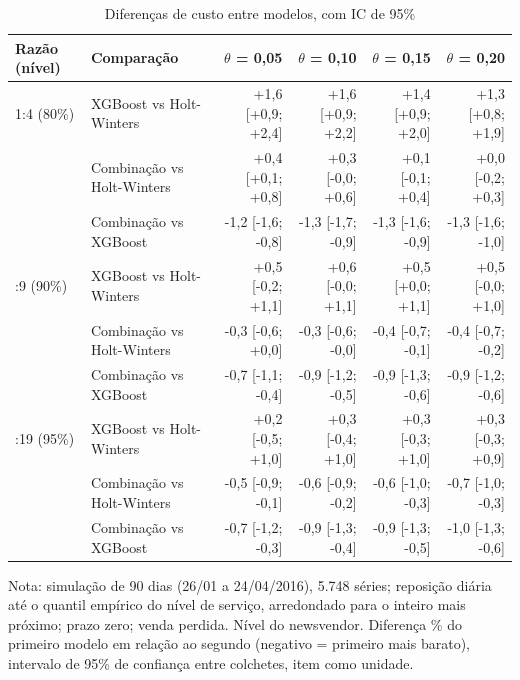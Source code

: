 \begin{table}[htbp]
\centering
\small
\caption{Diferenças de custo entre modelos, com IC de 95\%}
\label{tab:sim_diferencas}
\begin{tabular}{llrrrr}
\toprule
Razão (nível) & Comparação & $\theta$ = 0,05 & $\theta$ = 0,10 & $\theta$ = 0,15 & $\theta$ = 0,20 \\
\midrule
1:4 (80\%) & XGBoost vs Holt-Winters & +1,6 [+0,9; +2,4] & +1,6 [+0,9; +2,2] & +1,4 [+0,9; +2,0] & +1,3 [+0,8; +1,9] \\
 & Combinação vs Holt-Winters & +0,4 [+0,1; +0,8] & +0,3 [-0,0; +0,6] & +0,1 [-0,1; +0,4] & +0,0 [-0,2; +0,3] \\
 & Combinação vs XGBoost & -1,2 [-1,6; -0,8] & -1,3 [-1,7; -0,9] & -1,3 [-1,6; -0,9] & -1,3 [-1,6; -1,0] \\
\addlinespace
1:9 (90\%) & XGBoost vs Holt-Winters & +0,5 [-0,2; +1,1] & +0,6 [-0,0; +1,1] & +0,5 [+0,0; +1,1] & +0,5 [-0,0; +1,0] \\
 & Combinação vs Holt-Winters & -0,3 [-0,6; +0,0] & -0,3 [-0,6; -0,0] & -0,4 [-0,7; -0,1] & -0,4 [-0,7; -0,2] \\
 & Combinação vs XGBoost & -0,7 [-1,1; -0,4] & -0,9 [-1,2; -0,5] & -0,9 [-1,3; -0,6] & -0,9 [-1,2; -0,6] \\
\addlinespace
1:19 (95\%) & XGBoost vs Holt-Winters & +0,2 [-0,5; +1,0] & +0,3 [-0,4; +1,0] & +0,3 [-0,3; +1,0] & +0,3 [-0,3; +0,9] \\
 & Combinação vs Holt-Winters & -0,5 [-0,9; -0,1] & -0,6 [-0,9; -0,2] & -0,6 [-1,0; -0,3] & -0,7 [-1,0; -0,3] \\
 & Combinação vs XGBoost & -0,7 [-1,2; -0,3] & -0,9 [-1,3; -0,4] & -0,9 [-1,3; -0,5] & -1,0 [-1,3; -0,6] \\
\bottomrule
\end{tabular}
\par\smallskip
{\footnotesize Nota: simulação de 90 dias (26/01 a 24/04/2016), 5.748 séries; reposição diária até o quantil empírico do nível de serviço, arredondado para o inteiro mais próximo; prazo zero; venda perdida. Nível do newsvendor. Diferença \% do primeiro modelo em relação ao segundo (negativo = primeiro mais barato), intervalo de 95\% de confiança entre colchetes, item como unidade.}
\end{table}
